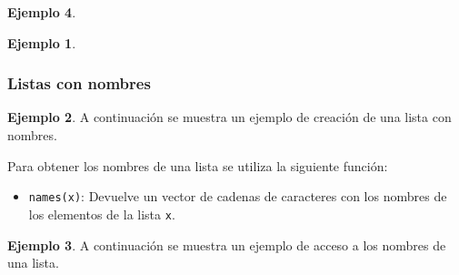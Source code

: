 \documentclass[
]{book}
\newenvironment{Shaded}{\begin{snugshade}}{\end{snugshade}}
\newcommand{\CommentTok}[1]{\textcolor[rgb]{0.56,0.35,0.01}{\textit{#1}}}
\newcommand{\DecValTok}[1]{\textcolor[rgb]{0.00,0.00,0.81}{#1}}
\newcommand{\FunctionTok}[1]{\textcolor[rgb]{0.00,0.00,0.00}{#1}}
\newcommand{\NormalTok}[1]{#1}
\newcommand{\OtherTok}[1]{\textcolor[rgb]{0.56,0.35,0.01}{#1}}
\newcommand{\StringTok}[1]{\textcolor[rgb]{0.31,0.60,0.02}{#1}}
\providecommand{\tightlist}{%
  \setlength{\itemsep}{0pt}\setlength{\parskip}{0pt}}
\theoremstyle{definition}
\theoremstyle{definition}
\newtheorem{example}{Ejemplo}[chapter]
\theoremstyle{definition}
\theoremstyle{definition}
\theoremstyle{remark}
\begin{document}
\begin{example}
\begin{example}
\end{example}

\hypertarget{listas-con-nombres}{%
\subsubsection{Listas con nombres}\label{listas-con-nombres}}

\begin{example}

A continuación se muestra un ejemplo de creación de una lista con nombres.

\begin{Shaded}
\end{Shaded}

\end{example}

Para obtener los nombres de una lista se utiliza la siguiente función:

\begin{itemize}
\tightlist
\item
  \texttt{names(x)}: Devuelve un vector de cadenas de caracteres con los nombres de los elementos de la lista \texttt{x}.
\end{itemize}

\begin{example}

A continuación se muestra un ejemplo de acceso a los nombres de una lista.


\end{example}
\end{example}
\end{document}
